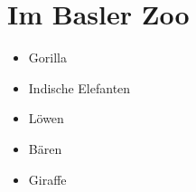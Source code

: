 \section{Im Basler Zoo}

\begin{itemize}
 
\item Gorilla
 
\item Indische Elefanten
 
\item Löwen

\item Bären

\item Giraffe

\end{itemize}
   

